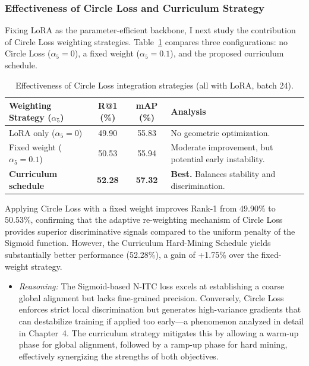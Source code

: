 \documentclass[../main.tex]{subfiles}
\begin{document}
\subsubsection{Effectiveness of Circle Loss and Curriculum Strategy}

\noindent Fixing LoRA as the parameter-efficient backbone, I next study the contribution of Circle Loss weighting strategies. Table~\ref{tab:circle_strategy} compares three configurations: no Circle Loss ($\alpha_5{=}0$), a fixed weight ($\alpha_5{=}0.1$), and the proposed curriculum schedule.

\begin{table}[htbp]
\centering
\caption{Effectiveness of Circle Loss integration strategies (all with LoRA, batch 24).}
\label{tab:circle_strategy}
\renewcommand{\arraystretch}{1.3}
\begin{tabularx}{\textwidth}{lccX}
\toprule
\textbf{Weighting Strategy ($\alpha_5$)} & \textbf{R@1 (\%)} & \textbf{mAP (\%)} & \textbf{Analysis} \\
\midrule
LoRA only ($\alpha_5=0$) & 49.90 & 55.83 & No geometric optimization. \\
Fixed weight ($\alpha_5=0.1$) & 50.53 & 55.94 & Moderate improvement, but potential early instability. \\
\textbf{Curriculum schedule} & \textbf{52.28} & \textbf{57.32} & \textbf{Best.} Balances stability and discrimination. \\
\bottomrule
\end{tabularx}
\end{table}

\noindent Applying Circle Loss with a fixed weight improves Rank-1 from 49.90\% to 50.53\%, confirming that the adaptive re-weighting mechanism of Circle Loss provides superior discriminative signals compared to the uniform penalty of the Sigmoid function. However, the Curriculum Hard-Mining Schedule yields substantially better performance (52.28\%), a gain of +1.75\% over the fixed-weight strategy.

\begin{itemize}
    \item \textit{Reasoning:} The Sigmoid-based N-ITC loss excels at establishing a coarse global alignment but lacks fine-grained precision. Conversely, Circle Loss enforces strict local discrimination but generates high-variance gradients that can destabilize training if applied too early---a phenomenon analyzed in detail in Chapter~4. The curriculum strategy mitigates this by allowing a warm-up phase for global alignment, followed by a ramp-up phase for hard mining, effectively synergizing the strengths of both objectives.
\end{itemize}
\end{document}
